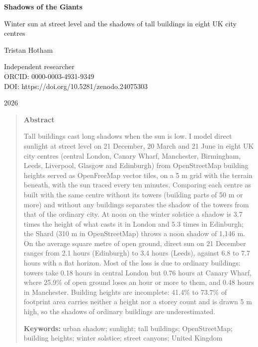 \documentclass[11pt,a4paper]{article}
\begin{document}
\begin{center}
{\Large\bfseries Shadows of the Giants\par}
\vspace{0.4em}
{\large Winter sun at street level and the shadows of tall buildings in eight UK city centres\par}
\vspace{1.2em}
{\large Tristan Hotham\par}
\vspace{0.3em}
{\small Independent researcher\\
ORCID: 0000-0003-4931-9349\\
DOI: https://doi.org/10.5281/zenodo.24075303\par}
\vspace{0.8em}
2026
\end{center}

\begin{quote}
\small
\begin{center}\textbf{Abstract}\end{center}
Tall buildings cast long shadows when the sun is low. I model direct sunlight at street level on 21 December, 20 March and 21 June in eight UK city centres (central London, Canary Wharf, Manchester, Birmingham, Leeds, Liverpool, Glasgow and Edinburgh) from OpenStreetMap building heights served as OpenFreeMap vector tiles, on a 5 m grid with the terrain beneath, with the sun traced every ten minutes. Comparing each centre as built with the same centre without its towers (building parts of 50 m or more) and without any buildings separates the shadow of the towers from that of the ordinary city. At noon on the winter solstice a shadow is 3.7 times the height of what casts it in London and 5.3 times in Edinburgh; the Shard (310 m in OpenStreetMap) throws a noon shadow of 1,146 m. On the average square metre of open ground, direct sun on 21 December ranges from 2.1 hours (Edinburgh) to 3.4 hours (Leeds), against 6.8 to 7.7 hours with a flat horizon. Most of the loss is due to ordinary buildings: towers take 0.18 hours in central London but 0.76 hours at Canary Wharf, where 25.9\% of open ground loses an hour or more to them, and 0.48 hours in Manchester. Building heights are incomplete: 41.4\% to 73.7\% of footprint area carries neither a height nor a storey count and is drawn 5 m high, so the shadows of ordinary buildings are underestimated.

\textbf{Keywords:} urban shadow; sunlight; tall buildings; OpenStreetMap; building heights; winter solstice; street canyons; United Kingdom
\end{quote}
\end{document}
